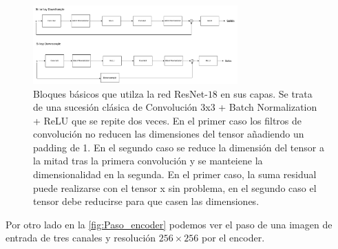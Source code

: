             \begin{figure}[!h]
                \centering
                \includegraphics[width=0.7\textwidth]{img/bloque_basico_encoder.png}
                \caption{Bloques básicos que utilza la red ResNet-$18$ en sus capas. Se trata de una sucesión clásica de Convolución 3x3 + Batch Normalization + ReLU que se repite dos veces. En el primer caso los filtros de convolución no reducen las dimensiones del tensor añadiendo un padding de 1. En el segundo caso se reduce la dimensión del tensor a la mitad tras la primera convolución y se manteiene la dimensionalidad en la segunda. En el primer caso, la suma residual puede realizarse con el tensor x sin problema, en el segundo caso el tensor debe reducirse para que casen las dimensiones.}
                \label{fig:bloque_encoder}
            \end{figure}

            \medskip 

            \noindent Por otro lado en la \autoref{fig:Paso_encoder} podemos ver el paso de una imagen de entrada de tres canales y resolución $256 \times 256$ por el encoder.

